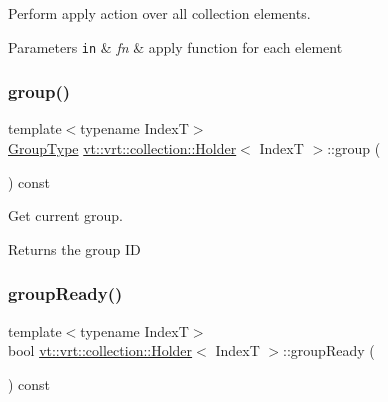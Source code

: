Perform apply action over all collection elements. 


\begin{DoxyParams}[1]{Parameters}
\mbox{\tt in}  & {\em fn} & apply function for each element \\
\hline
\end{DoxyParams}
\mbox{\label{structvt_1_1vrt_1_1collection_1_1_holder_a0bcb968630cce9e2da7a68dbbd46d746}} 
\subsubsection{\texorpdfstring{group()}{group()}}
{\footnotesize\ttfamily template$<$typename IndexT$>$ \\
\hyperlink{namespacevt_a27b5e4411c9b6140c49100e050e2f743}{Group\+Type} \hyperlink{structvt_1_1vrt_1_1collection_1_1_holder}{vt\+::vrt\+::collection\+::\+Holder}$<$ IndexT $>$\+::group (\begin{DoxyParamCaption}{ }\end{DoxyParamCaption}) const\hspace{0.3cm}{\ttfamily [inline]}}



Get current group. 

\begin{DoxyReturn}{Returns}
the group ID 
\end{DoxyReturn}
\mbox{\label{structvt_1_1vrt_1_1collection_1_1_holder_a84bec2251b3eb324f9db28b979a7a51d}} 
\subsubsection{\texorpdfstring{group\+Ready()}{groupReady()}}
{\footnotesize\ttfamily template$<$typename IndexT$>$ \\
bool \hyperlink{structvt_1_1vrt_1_1collection_1_1_holder}{vt\+::vrt\+::collection\+::\+Holder}$<$ IndexT $>$\+::group\+Ready (\begin{DoxyParamCaption}{ }\end{DoxyParamCaption}) const\hspace{0.3cm}{\ttfamily [inline]}}



